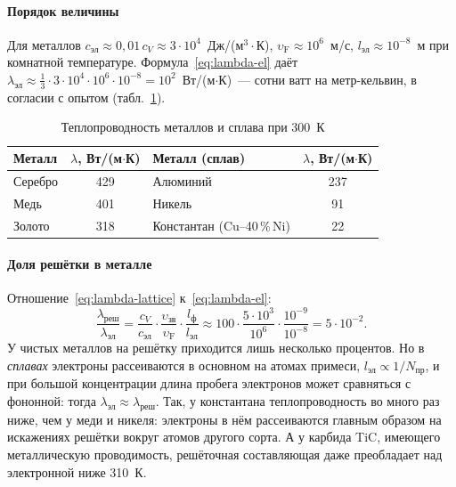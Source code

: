 \paragraph{Порядок величины}
Для металлов $c_\text{эл}\approx0{,}01\,c_V\approx3\cdot10^4$~Дж/(м$^3\cdot$К),
$\upsilon_\text{F}\approx10^6$~м/с, $l_\text{эл}\approx10^{-8}$~м при комнатной
температуре. Формула~\eqref{eq:lambda-el} даёт
$\lambda_\text{эл}\approx\frac13\cdot3\cdot10^4\cdot10^6\cdot10^{-8}=10^2$~Вт/(м$\cdot$К)~—
сотни ватт на метр-кельвин, в согласии с опытом (табл.~\ref{tab:lambda-metals}).

\begin{table}[ht]
\centering
\caption{Теплопроводность металлов и сплава при 300~К}\label{tab:lambda-metals}
\small
\begin{tabular}{lc@{\qquad}lc}
\toprule
Металл & $\lambda$, Вт/(м$\cdot$К) & Металл (сплав) & $\lambda$, Вт/(м$\cdot$К)\\
\midrule
Серебро & 429 & Алюминий & 237\\
Медь & 401 & Никель & 91\\
Золото & 318 & Константан (Cu--40\,\%\,Ni) & 22\\
\bottomrule
\end{tabular}
\end{table}

\paragraph{Доля решётки в металле}
Отношение~\eqref{eq:lambda-lattice} к~\eqref{eq:lambda-el}:
\[
\frac{\lambda_\text{реш}}{\lambda_\text{эл}}=\frac{c_V}{c_\text{эл}}\cdot
\frac{\upsilon_\text{зв}}{\upsilon_\text{F}}\cdot\frac{l_\text{ф}}{l_\text{эл}}
\approx100\cdot\frac{5\cdot10^3}{10^6}\cdot\frac{10^{-9}}{10^{-8}}=5\cdot10^{-2}.
\]
У чистых металлов на решётку приходится лишь несколько процентов.
Но в \emph{сплавах} электроны рассеиваются в основном на атомах примеси,
$l_\text{эл}\propto1/N_\text{пр}$, и при большой концентрации длина пробега
электронов может сравняться с фононной: тогда
$\lambda_\text{эл}\approx\lambda_\text{реш}$. Так, у константана теплопроводность
во много раз ниже, чем у меди и никеля: электроны в нём рассеиваются
главным образом на искажениях решётки вокруг атомов другого сорта. А у
карбида TiC, имеющего металлическую проводимость, решёточная составляющая
даже преобладает над электронной ниже 310~К.

